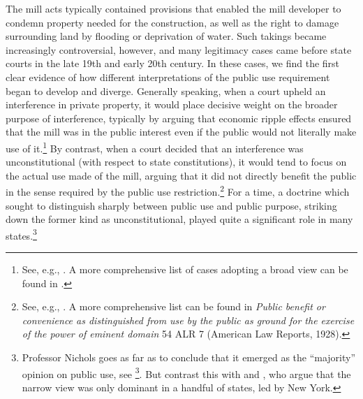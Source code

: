 The mill acts typically contained provisions that enabled the mill developer to condemn property needed for the construction, as well as the right to damage surrounding land by flooding or deprivation of water. Such takings became increasingly controversial, however, and many legitimacy cases came before state courts in the late 19th and early 20th century. In these cases, we find the first clear evidence of how different interpretations of the public use requirement began to develop and diverge. Generally speaking, when a court upheld an interference in private property, it would place decisive weight on the broader purpose of interference, typically by arguing that economic ripple effects ensured that the mill was in the public interest even if the public would not literally make use of it.\footnote{See, e.g., \cite{hazen53,scudder32,boston32}. A more comprehensive list of cases adopting a broad view can be found in \cite[617]{nichols40}.} By contrast, when a court decided that an interference was unconstitutional (with respect to state constitutions), it would tend to focus on the actual use made of the mill, arguing that it did not directly benefit the public in the sense required by the public use restriction.\footnote{See, e.g., \cite{sadler59,ryerson77,gaylord03,minn06}. A more comprehensive list can be found in {\it Public benefit or convenience as distinguished from use by the public as ground for the exercise of the power of eminent domain} 54 ALR 7 (American Law Reports, 1928).} For a time, a doctrine which sought to distinguish sharply between public use and public purpose, striking down the former kind as unconstitutional, played quite a significant role in many states.\footnote{Professor Nichols goes as far as to conclude that it emerged as the ``majority'' opinion on public use, see \footcite[617-618]{nichols40}. But contrast this with \cite{berger78} and \cite[24]{meidinger80}, who argue that the narrow view was only dominant in a handful of states, led by New York.}


